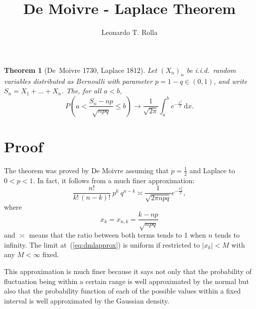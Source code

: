 \documentclass[12pt]{article}
\newtheorem{theorem}[equation]{Theorem}
\theoremstyle{definition}
\newcommand{\dd}{\mathrm{d}}
\renewcommand{\leq}{\leqslant}
\begin{document}
\title{De Moivre - Laplace Theorem}
\author{Leonardo T. Rolla}
\maketitle

{\let\thefootnote\relax
{}}

\begin{theorem}
[De~Moivre 1730, Laplace 1812]
\label{thm:demoivrelaplace}
Let $(X_{n})_{n}$ be i.i.d.\ random variables distributed as Bernoulli with parameter $p=1-q\in(0,1)$, and write $S_{n}=X_{1}+\dots+X_{n}$.
The, for all $a<b$,
\begin{equation*}
P \left( a < \frac{S_{n}-np}{\sqrt{npq}} \leq b \right) \to \frac{1}{\sqrt{2\pi}} \int_a^b e^{-\frac{x^2}{2}} \, \dd x.
\end{equation*}
\end{theorem}

\section*{Proof}

The theorem was proved by De Moivre assuming that $ p = \frac {1} {2} $ and Laplace to $ 0 <p <1 $. In fact, it follows from a much finer approximation:
\begin{equation}
\label{eq:dmlapprox}
\frac{n!}{k! \, (n-k)!} \ p^k \ q^{n-k}
\asymp
\frac{1}{\sqrt{2\pi npq}} e^{-\frac{x_k^2}{2}},
\tag{$\ast$}
\end{equation}
where
\[
x_k = x_{n,k} = \frac{k-np}{\sqrt{npq}}
\]
and $ \asymp $ means that the ratio between both terms tends to 1 when $ n $ tends to infinity. The limit at~(\ref{eq:dmlapprox}) is uniform if restricted to $ | x_k | <M $ with any $ M <\infty $ fixed.

This approximation is much finer because it says not only that the probability of fluctuation being within a certain range is well approximated by the normal but also that the probability function of each of the possible values within a fixed interval is well approximated by the Gaussian density.
\end{document}
